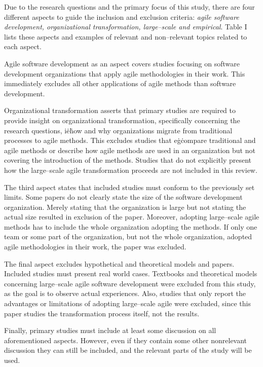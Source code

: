 Due to the research questions and the primary focus of this study, there are
four different aspects to guide the inclusion and exclusion criteria:
\textit{agile software development, organizational transformation, large–scale
and empirical}. Table I lists these aspects and examples of relevant and
non–relevant topics related to each aspect.

\pagebreak

\vspace{1.5cm}

Agile software development as an aspect covers studies focusing on
software development organizations that apply agile methodologies in
their work. This immediately excludes all other applications of agile
methods than software development.

Organizational transformation asserts that primary studies are required
to provide insight on organizational transformation, specifically
concerning the research questions, i\.e\. how and why organizations
migrate from traditional processes to agile methods. This excludes
studies that e\.g\. compare traditional and agile methods or describe
how agile methods are used in an organization but not covering the
introduction of the methods. Studies that do not explicitly present how
the large–scale agile transformation proceeds are not included in this
review.

The third aspect states that included studies must conform to the
previously set limits. Some papers do not clearly state the size of the
software development organization. Merely stating that the organization
is large but not stating the actual size resulted in exclusion of the
paper. Moreover, adopting large–scale agile methods has to include the
whole organization adopting the methods. If only one team or some part
of the organization, but not the whole organization, adopted agile
methodologies in their work, the paper was excluded.

The final aspect excludes hypothetical and theoretical models and
papers. Included studies must present real world cases. Textbooks
and theoretical models concerning large–scale agile software
development were excluded from this study, as the goal is to observe
actual experiences. Also, studies that only report the advantages or
limitations of adopting large–scale agile were excluded, since this
paper studies the transformation process itself, not the results.

Finally, primary studies must include at least some discussion on
all aforementioned aspects. However, even if they contain some other
nonrelevant discussion they can still be included, and the relevant
parts of the study will be used.
